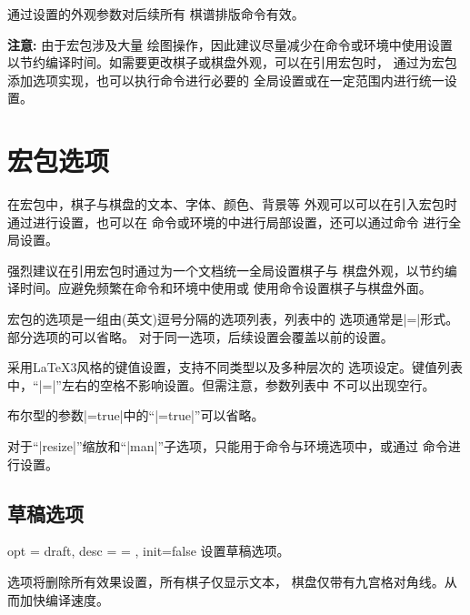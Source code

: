 \documentclass[full]{l3doc}
\begin{document}
\begin{documentation}
  通过设置的外观参数对后续所有
  棋谱排版命令有效。

  \textbf{\textsf{注意: }}由于宏包涉及大量
  绘图操作，因此建议尽量减少在命令或环境中使用设置%
  以节约编译时间。如需要更改棋子或棋盘外观，可以在引用宏包时，
  通过为宏包添加选项实现，也可以执行命令进行必要的
  全局设置或在一定范围内进行统一设置。



\section{宏包选项}

在宏包中，棋子与棋盘的文本、字体、颜色、背景等
外观可以可以在引入宏包时通过进行设置，也可以在
命令或环境的中进行局部设置，还可以通过命令
进行全局设置。

强烈建议在引用宏包时通过为一个文档统一全局设置棋子与
棋盘外观，以节约编译时间。应避免频繁在命令和环境中使用或
使用命令设置棋子与棋盘外面。

宏包的选项是一组由(英文)逗号分隔的选项列表，列表中的
选项通常是|=|形式。部分选项的可以省略。
对于同一选项，后续设置会覆盖以前的设置。

采用\LaTeX3风格的键值设置，支持不同类型以及多种层次的
选项设定。键值列表中，``|=|''左右的空格不影响设置。但需注意，参数列表中%
\textsf{不可以出现空行}。

布尔型的参数|=true|中的``|=true|''可以省略。

对于``|resize|''缩放和``|man|''子选项，只能用于命令与环境选项中，或通过
命令进行设置。

\subsection{草稿选项}

\begin{option}{ opt = draft, desc = {= }, init=false }
  设置草稿选项。
\end{option}

  选项将删除所有效果设置，所有棋子仅显示文本，
  棋盘仅带有九宫格对角线。从而加快编译速度。


\end{documentation}
\end{document}
